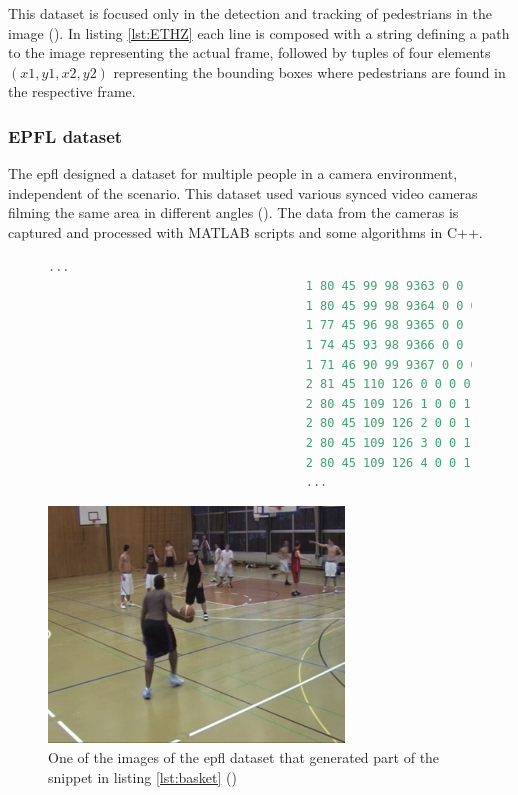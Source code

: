 This dataset is focused only in the detection and tracking of pedestrians in the image (\cite{ETHZEidgenossischeTechnischeHochschuleZurich}). In listing \ref{lst:ETHZ} each line is composed with a string defining a path to the image representing the actual frame, followed by tuples of four elements $(x1,y1,x2,y2)$ representing the bounding boxes where pedestrians are found in the respective frame. 

\subsubsection{EPFL dataset}
The \gls{epfl} designed a dataset for multiple people in a camera environment, independent of the scenario. This dataset used various synced video cameras filming the same area in different angles (\cite{Biliotti}). The data from the cameras is captured and processed with MATLAB scripts and some algorithms in C++.

\begin{figure}
\begin{center}
	\begin{lstlisting}[label={lst:basket}, caption={EPFL dataset file snippet (\cite{EPFLEcolepolytechniquefederaledeLausanne})},language=c++]
									...
									1 80 45 99 98 9363 0 0 1 "PERSON"
									1 80 45 99 98 9364 0 0 0 "PERSON"
									1 77 45 96 98 9365 0 0 1 "PERSON"
									1 74 45 93 98 9366 0 0 1 "PERSON"
									1 71 46 90 99 9367 0 0 0 "PERSON"
									2 81 45 110 126 0 0 0 0 "PERSON"
									2 80 45 109 126 1 0 0 1 "PERSON"
									2 80 45 109 126 2 0 0 1 "PERSON"
									2 80 45 109 126 3 0 0 1 "PERSON"
									2 80 45 109 126 4 0 0 1 "PERSON"
									...	\end{lstlisting}
\end{center}
\end{figure}

\begin{figure}[htp]
	
	\centering
	\includegraphics[width=0.7\textwidth]{capstate/imgs/basket.png}
	
	\caption{One of the images of the \gls{epfl} dataset that generated part of the snippet in listing \ref{lst:basket} (\cite{EPFLEcolepolytechniquefederaledeLausanne})}
	\label{fig:basketimg}
	
\end{figure}


